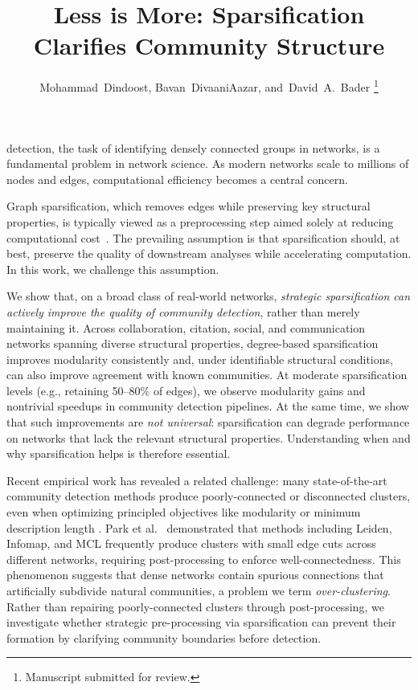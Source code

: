 \documentclass[10pt,journal,compsoc]{IEEEtran}
\title{Less is More: Sparsification Clarifies Community Structure}
\author{Mohammad~Dindoost, Bavan~DivaaniAazar, and~David~A.~Bader%
\IEEEcompsocitemizethanks{\IEEEcompsocthanksitem M. Dindoost, B. DivaaniAazar, and D.~A.~Bader are with the Department of Computer Science, New Jersey Institute of Technology, Newark, NJ 07102 USA.\protect\\
E-mail: md724@njit.edu, bd344@njit.edu, bader@njit.edu}%
\thanks{Manuscript submitted for review.}}
\begin{document}
\maketitle
\IEEEdisplaynontitleabstractindextext
\IEEEpeerreviewmaketitle

 detection, the task of identifying densely connected groups in networks, is a fundamental problem in network science\cite{fortunato202220, karatacs2018application}.
As modern networks scale to millions of nodes and edges, computational efficiency becomes a central concern.
 
Graph sparsification, which removes edges while preserving key structural properties, is typically viewed as a preprocessing step aimed solely at reducing computational cost~\cite{spielman2008graph,benczur2015randomized}. 
The prevailing assumption is that sparsification should, at best, preserve the quality of downstream analyses while accelerating computation.
In this work, we challenge this assumption.

We show that, on a broad class of real-world networks, \emph{strategic sparsification can actively improve the quality of community detection}, rather than merely maintaining it.
Across collaboration, citation, social, and communication networks spanning diverse structural properties, degree-based sparsification improves modularity consistently and, under identifiable structural conditions, can also improve agreement with known communities.
At moderate sparsification levels (e.g., retaining 50--80\% of edges), we observe modularity gains and nontrivial speedups in community detection pipelines.
At the same time, we show that such improvements are \emph{not universal}: sparsification can degrade performance on networks that lack the relevant structural properties.
Understanding when and why sparsification helps is therefore essential.

Recent empirical work has revealed a related challenge: many state-of-the-art community detection methods produce poorly-connected or disconnected clusters, even when optimizing principled objectives like modularity or minimum description length \cite{park2024improved-WCC, park_cm_2024-journal,ramavarapu2024cm++,dindoost2025optimization}.
Park et al.~\cite{park_cm_2024-journal} demonstrated that methods including Leiden\cite{traag2019louvain}, Infomap\cite{rosvall2008maps}, and MCL frequently produce clusters with small edge cuts across different networks, requiring post-processing to enforce well-connectedness.
This phenomenon suggests that dense networks contain spurious connections that artificially subdivide natural communities, a problem we term \emph{over-clustering}.
Rather than repairing poorly-connected clusters through post-processing, we investigate whether strategic pre-processing via sparsification can prevent their formation by clarifying community boundaries before detection.
\end{document}
